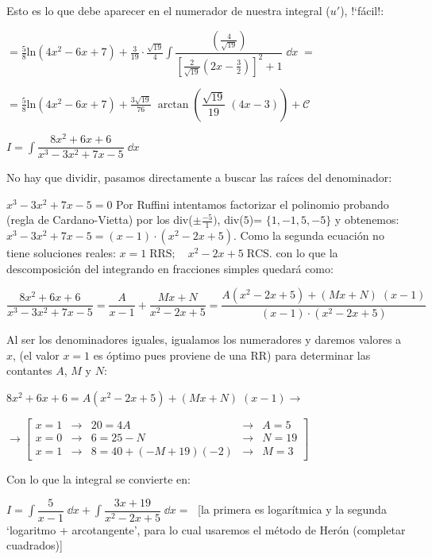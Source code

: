 {\begin{ejem}
   Esto es lo que debe aparecer en el numerador de nuestra integral ($u'$), !`fácil!:
   
   $= \displaystyle \frac 5 8 \mathrm{ln} (4x^2-6x+7) + \frac {3}{19} \cdot \frac {\sqrt{19}}{4} \int 
  \dfrac { \left(\frac {4}{\sqrt{19}} \right) }{\left [ \frac {2}{\sqrt{19}} \left( 2x-\frac 3 2 \right)  \right]^2 +1  }
  \; \dd x\; = $ 
  
  $= \displaystyle \frac 5 8 \mathrm{ln} (4x^2-6x+7) + \frac {3 \sqrt{19}}{76}\; \arctan \left( \dfrac{\sqrt{19}}{19}\;(4x-3) \right)+ \mathcal C$
 
\end{ejem}

\begin{ejem} $I=\displaystyle \int\dfrac {8x^2+6x+6}{x^3-3x^2+7x-5} \; \dd x$

No hay que dividir, pasamos directamente a buscar las raíces del denominador:

$x^3-3x^2+7x-5=0$ Por Ruffini intentamos factorizar el polinomio probando (regla de Cardano-Vietta) por los div($\pm \frac {-5}{1})$, div($5$)= $  \{ 1, -1, 5, -5 \} $ y obtenemos:
$x^3-3x^2+7x-5=(x-1)\cdot (x^2-2x+5)$. Como la segunda ecuación no tiene soluciones reales: $x=1\; \text {RRS}; \quad x^2-2x+5\; \text {RCS}$. con lo que la descomposición del integrando en fracciones simples quedará como:


$\displaystyle\dfrac {8x^2+6x+6}{x^3-3x^2+7x-5} =\dfrac{A}{x-1} + \dfrac {Mx+N}{x^2-2x+5}= \dfrac {A(x^2-2x+5)+(Mx+N)\; (x-1)}{(x-1)\cdot (x^2-2x+5) }$

Al ser los denominadores iguales, igualamos los numeradores y daremos valores a $x$, (el valor $x=1$ es óptimo pues proviene de una RR) para determinar las contantes $A$, $M$ y $N$:

$8x^2+6x+6 = A(x^2-2x+5)+(Mx+N)\; (x-1) \to $

$\to \left[ \begin{matrix} x=1  & \to & 20=4A & \to & A=5 \\
x=0  & \to & 6=25-N & \to & N=19\\
x=1 & \to & 8=40+(-M+19)(-2) & \to &  M=3\end{matrix} \right] $


Con lo que la integral se convierte en:

$I=\displaystyle \int \dfrac{5}{x-1}\; \dd x + \int \dfrac {3x+19}{x^2-2x+5}\; \dd x=\; $ [la primera es logarítmica y la segunda `logaritmo + arcotangente', para lo cual usaremos el método de Herón (completar cuadrados)]


\end{ejem}}
